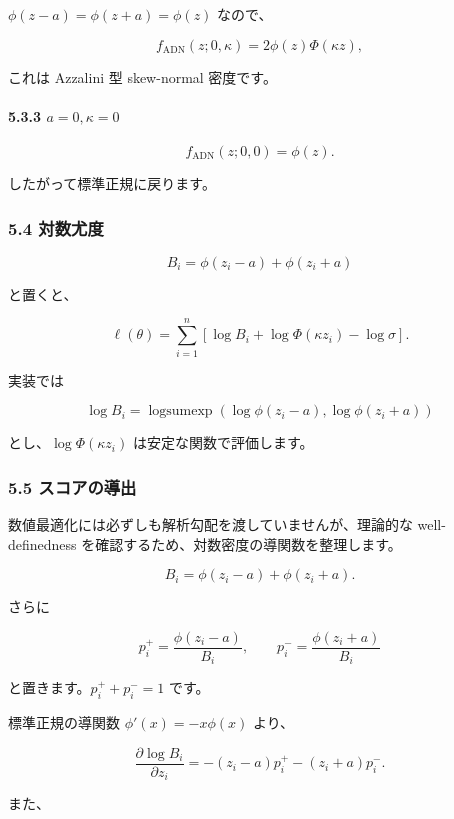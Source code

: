 \documentclass[
]{article}
\begin{document}
\(\phi(z-a)=\phi(z+a)=\phi(z)\) なので、

\[
f_{\mathrm{ADN}}(z;0,\kappa)
=2\phi(z)\Phi(\kappa z),
\]

これは Azzalini 型 skew-normal 密度です。

\hypertarget{a0kappa0}{%
\paragraph{\texorpdfstring{5.3.3
\(a=0,\kappa=0\)}{5.3.3 a=0,\textbackslash kappa=0}}\label{a0kappa0}}

\[
f_{\mathrm{ADN}}(z;0,0)=\phi(z).
\]

したがって標準正規に戻ります。

\hypertarget{ux5bfeux6570ux5c24ux5ea6-2}{%
\subsubsection{5.4 対数尤度}\label{ux5bfeux6570ux5c24ux5ea6-2}}

\[
B_i=\phi(z_i-a)+\phi(z_i+a)
\]

と置くと、

\[
\ell(\theta)
=\sum_{i=1}^{n}\left[\log B_i+\log\Phi(\kappa z_i)-\log\sigma\right].
\]

実装では

\[
\log B_i=\operatorname{logsumexp}(\log\phi(z_i-a),\log\phi(z_i+a))
\]

とし、\(\log\Phi(\kappa z_i)\) は安定な関数で評価します。

\hypertarget{ux30b9ux30b3ux30a2ux306eux5c0eux51fa}{%
\subsubsection{5.5
スコアの導出}\label{ux30b9ux30b3ux30a2ux306eux5c0eux51fa}}

数値最適化には必ずしも解析勾配を渡していませんが、理論的な
well-definedness を確認するため、対数密度の導関数を整理します。

\[
B_i=\phi(z_i-a)+\phi(z_i+a).
\]

さらに

\[
p_i^+=\frac{\phi(z_i-a)}{B_i},
\qquad
p_i^- =\frac{\phi(z_i+a)}{B_i}
\]

と置きます。\(p_i^++p_i^-=1\) です。

標準正規の導関数 \(\phi'(x)=-x\phi(x)\) より、

\[
\frac{\partial \log B_i}{\partial z_i}
=-(z_i-a)p_i^+-(z_i+a)p_i^-.
\]

また、
\end{document}
